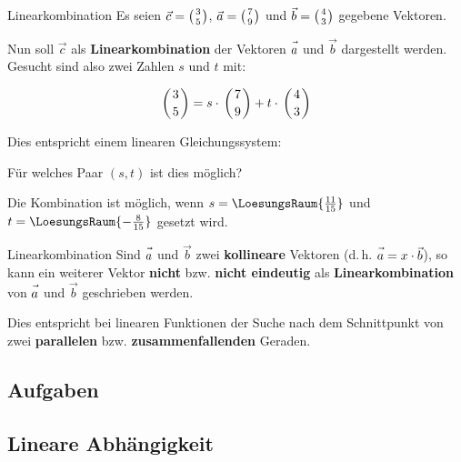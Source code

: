 \begin{beispiel}{Linearkombination}{}
  Es seien $\vec{c} = \left(3 \atop 5\right)$, $\vec{a} = \left(7 \atop
  9\right)$ und $\vec{b} = \left(4 \atop 3\right)$ gegebene Vektoren.

  Nun soll $\vec{c}$ als \textbf{Linearkombination} der Vektoren
  $\vec{a\vphantom{b}}$ und $\vec{b}$ dargestellt werden. Gesucht sind also zwei
  Zahlen $s$ und $t$ mit:

  $$\left(3 \atop 5\right) = s\cdot{} \left(7 \atop 9\right) +
  t\cdot{} \left(4 \atop 3\right)$$

  Dies entspricht einem linearen Gleichungssystem:

  Für welches Paar $(s, t)$ ist dies möglich?
  
  
  Die Kombination ist möglich, wenn $s=\LoesungsRaum{\frac{11}{15}}$ und\\
  $t=\LoesungsRaum{-\frac{8}{15}}$ gesetzt wird.
\end{beispiel}

\begin{bemerkung}{Linearkombination}{}
  Sind $\vec{a\vphantom{b}}$ und $\vec{b}$ zwei \textbf{kollineare} Vektoren
  (d.\,h. $\vec{a\vphantom{b}} = x\cdot{}\vec{b}$), so kann ein
  weiterer Vektor \textbf{nicht} bzw. \textbf{nicht eindeutig}  als \textbf{Linearkombination} von $\vec{a\vphantom{b}}$ und
  $\vec{b}$ geschrieben werden.

  Dies entspricht bei linearen Funktionen der Suche nach dem
  Schnittpunkt von zwei \textbf{parallelen} bzw. \textbf{zusammenfallenden} Geraden.
  \end{bemerkung}


\subsection*{Aufgaben}

\newpage
\subsection{Lineare Abhängigkeit}

